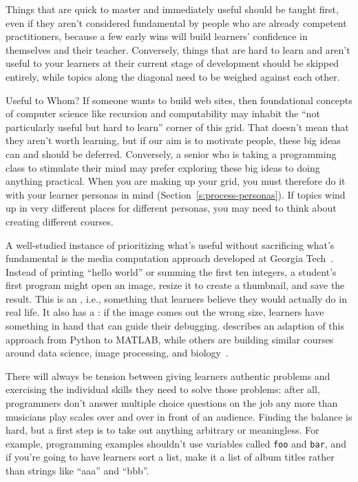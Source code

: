 
Things that are quick to master and immediately useful should be taught first,
even if they aren't considered fundamental by people who are already competent practitioners,
because a few early wins will build learners' confidence in themselves and their teacher.
Conversely,
things that are hard to learn and aren't useful to your learners at their current stage of development
should be skipped entirely,
while topics along the diagonal need to be weighed against each other.

\begin{aside}{Useful to Whom?}
  If someone wants to build web sites,
  then foundational concepts of computer science like recursion and computability
  may inhabit the ``not particularly useful but hard to learn'' corner of this grid.
  That doesn't mean that they aren't worth learning,
  but if our aim is to motivate people,
  these big ideas can and should be deferred.
  Conversely,
  a senior who is taking a programming class to stimulate their mind
  may prefer exploring these big ideas to doing anything practical.
  When you are making up your grid,
  you must therefore do it with your learner personas in mind
  (Section~\ref{s:process-personas}).
  If topics wind up in very different places for different personas,
  you may need to think about creating different courses.
\end{aside}

A well-studied instance of prioritizing what's useful
without sacrificing what's fundamental
is the media computation approach developed at Georgia Tech~\cite{Guzd2013}.
Instead of printing ``hello world'' or summing the first ten integers,
a student's first program might open an image,
resize it to create a thumbnail,
and save the result.
This is an ,
i.e.,
something that learners believe they would actually do in real life.
It also has a :
if the image comes out the wrong size,
learners have something in hand that can guide their debugging.
\cite{Lee2013} describes an adaption of this approach from Python to MATLAB,
while others are building similar courses around data science, image processing,
and biology~\cite{Dahl2018,Meys2018,Ritz2018}.

There will always be tension between giving learners authentic problems
and exercising the individual skills they need to solve those problems:
after all,
programmers don't answer multiple choice questions on the job
any more than musicians play scales over and over in front of an audience.
Finding the balance is hard,
but a first step is to take out anything arbitrary or meaningless.
For example,
programming examples shouldn't use variables called \texttt{foo} and \texttt{bar},
and if you're going to have learners sort a list,
make it a list of album titles rather than strings like ``aaa'' and ``bbb''.

